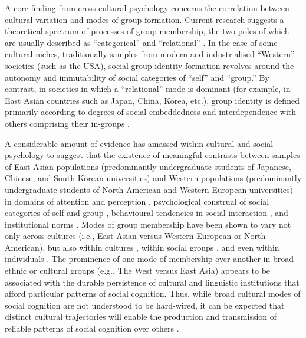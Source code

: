 \begin{CJK}{UTF8}{gbsn}
A core finding from cross-cultural psychology concerns the correlation between cultural variation and modes of group formation.  Current research suggests a theoretical spectrum of processes of group membership, the two poles of which are usually described as ``categorical'' and ``relational'' \citep{Hofstede1980,Brewer2007}.
In the case of some cultural niches, traditionally samples from modern and industrialised ``Western'' societies (such as the USA), social group identity formation revolves around the autonomy and immutability of social categories of ``self'' and ``group.''  By contrast, in societies in which a ``relational'' mode is dominant (for example, in East Asian countries such as Japan, China, Korea, etc.), group identity is defined primarily according to degrees of social embeddedness and interdependence with others comprising their in-groups \citep{Leung2012}.

A considerable amount of evidence has amassed within cultural and social psychology to suggest that the existence of meaningful contrasts between samples of East Asian populations (predominantly undergraduate students of Japanese, Chinese, and South Korean universities) and Western populations (predominantly undergraduate students of North American and Western European universities) in domains of attention and perception \citep{Peng1997,Nisbett2003}, psychological construal of social categories of self and group \citep{Markus1991}, behavioural tendencies in social interaction \citep{Yuki2003}, and institutional norms \citep{Liu2017}.
Modes of group membership have been shown to vary not only across cultures (i.e., East Asian versus Western European or North American), but also within cultures \citep{Henrich2014}, within social groups \citep[according to sex and personality differences, see][]{Yuki2014}, and even within individuals \citep[depending on contextual and situational primes, see][]{Lee2014,Wong2005}.  The prominence of one mode of membership over another in broad ethnic or cultural groups (e.g., The West versus East Asia) appears to be associated with the durable persistence of cultural and linguistic institutions that afford particular patterns of social cognition. Thus, while broad cultural modes of social cognition are not understood to be hard-wired, it can be expected that distinct cultural trajectories will enable the production and transmission of reliable patterns of social cognition over others \citep{Claidiere2014,Mesoudi2015}.


\end{CJK}
